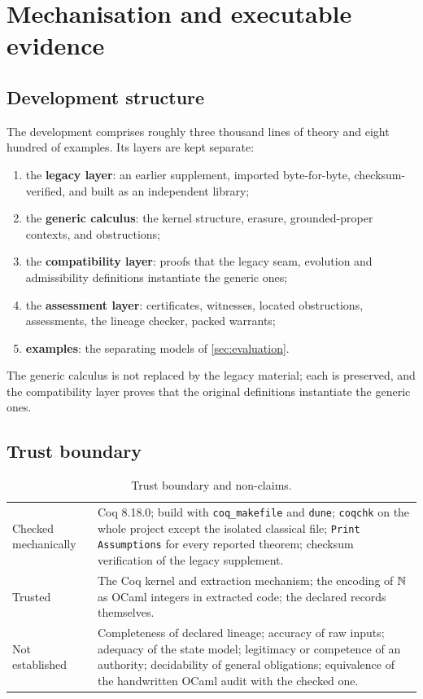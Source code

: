 \section{Mechanisation and executable evidence}\label{sec:mechanisation}

\subsection{Development structure}
The development comprises roughly three thousand lines of theory and eight hundred of examples. Its layers are kept separate:
\begin{enumerate}
\item the \textbf{legacy layer}: an earlier supplement, imported byte-for-byte, checksum-verified, and built as an independent library;
\item the \textbf{generic calculus}: the kernel structure, erasure, grounded-proper contexts, and obstructions;
\item the \textbf{compatibility layer}: proofs that the legacy seam, evolution and admissibility definitions instantiate the generic ones;
\item the \textbf{assessment layer}: certificates, witnesses, located obstructions, assessments, the lineage checker, packed warrants;
\item \textbf{examples}: the separating models of \cref{sec:evaluation}.
\end{enumerate}
The generic calculus is not replaced by the legacy material; each is preserved, and the compatibility layer proves that the original definitions instantiate the generic ones.

\subsection{Trust boundary}
\begin{table}[t]
\centering\small
\caption{Trust boundary and non-claims.}\label{tab:trust}
\begin{tabularx}{\textwidth}{@{}lY@{}}
\toprule
Checked mechanically & Coq 8.18.0; build with \texttt{coq\_makefile} and \texttt{dune}; \texttt{coqchk} on the whole project except the isolated classical file; \texttt{Print Assumptions} for every reported theorem; checksum verification of the legacy supplement. \\
Trusted & The Coq kernel and extraction mechanism; the encoding of $\mathbb{N}$ as OCaml integers in extracted code; the declared records themselves. \\
Not established & Completeness of declared lineage; accuracy of raw inputs; adequacy of the state model; legitimacy or competence of an authority; decidability of general obligations; equivalence of the handwritten OCaml audit with the checked one. \\
\bottomrule
\end{tabularx}
\end{table}

